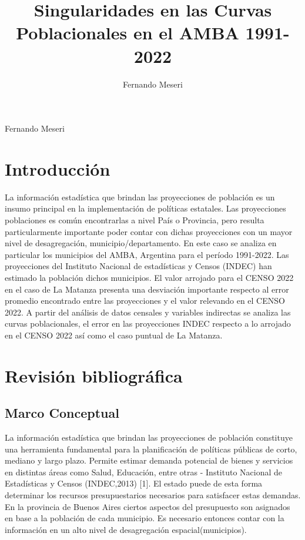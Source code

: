 \documentclass{article}
\title{Singularidades en las Curvas Poblacionales en el AMBA 1991-2022}
\author{Fernando Meseri}
\theoremstyle{mytheoremstyle}
\theoremstyle{mytheoremstyle}
\theoremstyle{myproblemstyle}
\begin{document}
    \maketitle
    Fernando Meseri
\section{ Introducción}
La información estadística que brindan las proyecciones de población es un insumo principal en la implementación de políticas estatales.  Las proyecciones poblaciones es común encontrarlas a nivel País o Provincia, pero resulta particularmente importante poder contar con dichas proyecciones con un mayor nivel de desagregación, municipio/departamento.
En este caso se analiza en particular los municipios del AMBA, Argentina para el período 1991-2022. Las proyecciones del Instituto Nacional de estadísticas y Censos (INDEC) han estimado la población dichos municipios. El valor arrojado para el CENSO 2022 en el caso de La Matanza presenta una desviación importante respecto al error promedio encontrado entre las proyecciones y el valor relevando en el CENSO 2022. A partir del análisis de datos censales y variables indirectas se analiza las curvas poblacionales, el error en las proyecciones INDEC respecto a lo arrojado en el CENSO 2022 así como el caso puntual de La Matanza.
\section{Revisión bibliográfica}
\subsection{Marco Conceptual}
  La información estadística que brindan las proyecciones de población constituye una herramienta fundamental para la planificación de políticas públicas de corto, mediano y largo plazo. Permite estimar demanda potencial de bienes y servicios en distintas áreas como Salud, Educación, entre otras - Instituto Nacional de Estadísticas y Censos (INDEC,2013) [1]. El estado puede de esta forma determinar los recursos presupuestarios necesarios para satisfacer estas demandas. En la provincia de Buenos Aires ciertos aspectos del presupuesto son asignados en base a la población de cada municipio. Es necesario entonces contar con la información 
  en un alto nivel de desagregación espacial(municipios).
\end{document}

